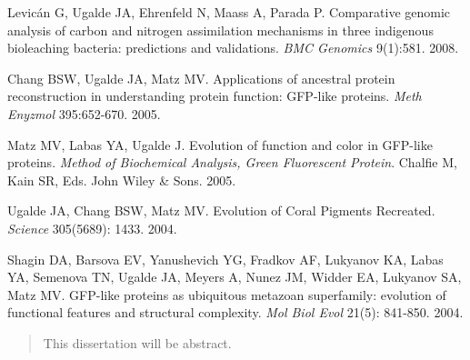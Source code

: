 \begin{frontmatter}
\begin{vitapage}
\begin{publications}
  \item Levic\'{a}n G, Ugalde JA, Ehrenfeld N, Maass A, Parada P. Comparative genomic analysis of carbon and nitrogen assimilation mechanisms in three indigenous bioleaching bacteria: predictions and validations. \emph{BMC Genomics} 9(1):581. 2008.
  
  \item Chang BSW, Ugalde JA, Matz MV. Applications of ancestral protein reconstruction in understanding protein function: GFP-like proteins. \emph{Meth Enyzmol} 395:652-670. 2005.
  
  \item Matz MV, Labas YA, Ugalde J. Evolution of function and color in GFP-like proteins. \emph{Method of Biochemical Analysis, Green Fluorescent Protein}. Chalfie M, Kain SR, Eds. John Wiley \& Sons. 2005.
  
  \item Ugalde JA, Chang BSW, Matz MV. Evolution of Coral Pigments Recreated. \emph{Science} 305(5689): 1433. 2004.
  
  \item Shagin DA, Barsova EV, Yanushevich YG, Fradkov AF, Lukyanov KA, Labas YA, Semenova TN, Ugalde JA, Meyers A, Nunez JM, Widder EA, Lukyanov SA, Matz MV. GFP-like proteins as ubiquitous metazoan superfamily: evolution of functional features and structural complexity. \emph{Mol Biol Evol} 21(5): 841-850. 2004.
  
\end{publications}
\end{vitapage}


%
%
\begin{abstract}
  This dissertation will be abstract. 
\end{abstract}


\end{frontmatter}